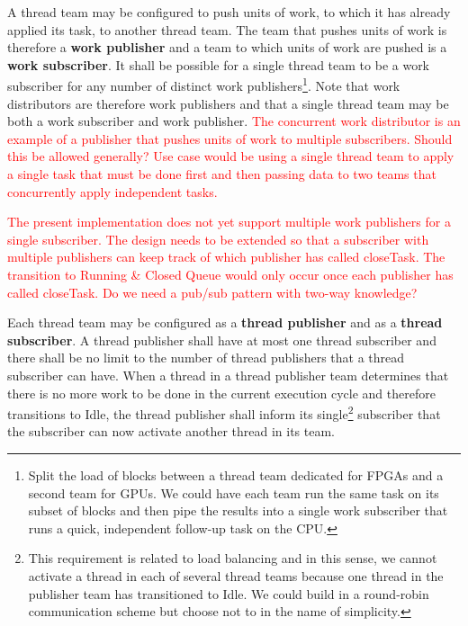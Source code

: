 \documentclass{article}
\begin{document}
\begin{req}
A thread team may be configured to push units of work, to which it has already
applied its task, to another thread team.  The team that pushes units of work is
therefore a \textbf{work publisher} and a team to which units of work are
pushed is a \textbf{work subscriber}.  It shall be possible for a single thread
team to be a work subscriber for any number of distinct work
publishers\footnote{Split the load of blocks between a thread team dedicated for
FPGAs and a second team for GPUs.  We could have each team run the same task on
its subset of blocks and then pipe the results into a single work subscriber
that runs a quick, independent follow-up task on the CPU.}.  Note that work
distributors are therefore work publishers and that a single thread team may be
both a work subscriber and work publisher.  \textcolor{red}{The concurrent work
distributor is an example of a publisher that pushes units of work to multiple
subscribers.  Should this be allowed generally?  Use case would be using a
single thread team to apply a single task that must be done first and then
passing data to two teams that concurrently apply independent tasks.}
\end{req}

\textcolor{red}{The present implementation does not yet support multiple work
publishers for a single subscriber.  The design needs to be extended so that
a subscriber with multiple publishers can keep track of which publisher has
called closeTask.  The transition to Running \& Closed Queue would only occur
once each publisher has called closeTask.  Do we need a pub/sub pattern with
two-way knowledge?}

\begin{req}
Each thread team may be configured as a \textbf{thread publisher} and as a
\textbf{thread subscriber}.  A thread publisher shall have at most one thread
subscriber and there shall be no limit to the number of thread publishers that a
thread subscriber can have.  When a thread in a thread publisher team determines
that there is no more work to be done in the current execution cycle and
therefore transitions to Idle, the thread publisher shall inform its
single\footnote{This requirement is related to load balancing and in this sense,
we cannot activate a thread in each of several thread teams because one thread
in the publisher team has transitioned to Idle.  We could build in a round-robin communication
scheme but choose not to in the name of simplicity.} subscriber that the
subscriber can now activate another thread in its team.
\end{req}
\end{document}
